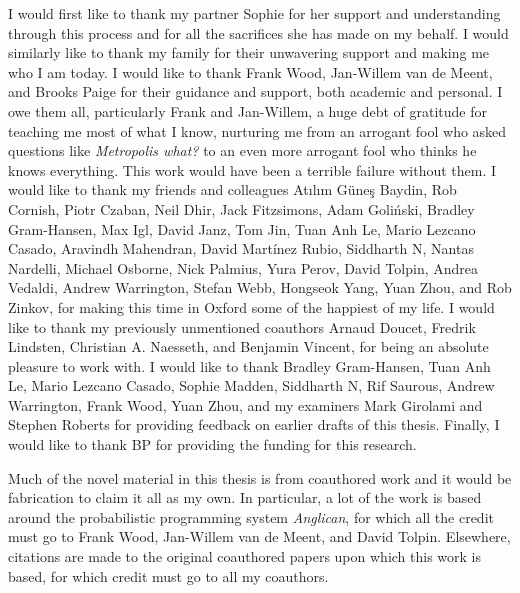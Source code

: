 
\vspace{20pt}
I would first like to thank my partner Sophie for her support and understanding through this
process and for all the sacrifices she has made on my behalf.  I would similarly like to
thank my family for their unwavering support and making me who I am today.  I would like
to thank Frank Wood, Jan-Willem van de Meent, and Brooks Paige for their guidance and
support, both academic and personal.  I owe them all, particularly Frank and Jan-Willem,
a huge debt of gratitude for teaching me most of what I know, nurturing me from an
arrogant fool who asked questions like \emph{Metropolis what?} to an even more arrogant
fool who thinks he knows everything.  This work would have been a terrible failure without them.
I would like to thank my friends and colleagues 
Atılım Güneş Baydin, Rob Cornish, Piotr Czaban, Neil Dhir, Jack Fitzsimons, Adam Goliński,
Bradley Gram-Hansen, Max Igl, David Janz, Tom Jin, Tuan Anh Le, Mario Lezcano Casado, 
Aravindh Mahendran, David Martínez Rubio, Siddharth N, Nantas Nardelli, Michael Osborne,
Nick Palmius, Yura Perov, David Tolpin, Andrea Vedaldi, Andrew Warrington, Stefan Webb, 
Hongseok Yang, Yuan Zhou, and Rob Zinkov, for making this time in Oxford some of the 
happiest of my life.  I would like to thank my previously unmentioned coauthors Arnaud Doucet, Fredrik Lindsten,
Christian A. Naesseth, and Benjamin Vincent, for being an absolute pleasure to work with.
I would like to thank Bradley Gram-Hansen, Tuan Anh Le, Mario Lezcano Casado, Sophie Madden, Siddharth N, Rif Saurous,
Andrew Warrington, Frank Wood, Yuan Zhou, and my examiners Mark Girolami and Stephen Roberts
for providing feedback on earlier drafts of this thesis.
Finally, I would like to thank BP for providing the funding for this research.

Much of the novel material in this thesis is from coauthored work and it would be fabrication
to claim it all as my own.  In particular, a lot of the work is based around the probabilistic 
programming system \emph{Anglican}, for which all the credit must go to Frank Wood,
Jan-Willem van de Meent, and David Tolpin. Elsewhere, citations are made
to the original coauthored papers upon which this work is based, for which credit
must go to all my coauthors.